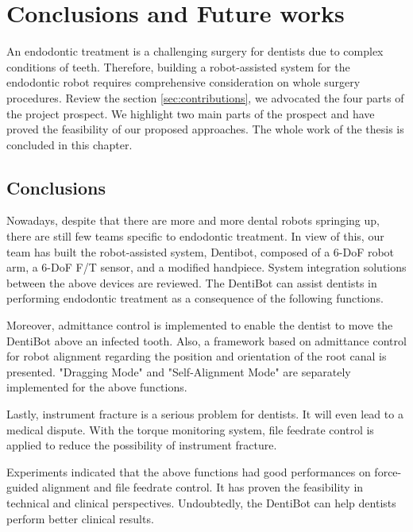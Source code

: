 \chapter{Conclusions and Future works}
\label{chapter7}
\hspace*{6mm}An endodontic treatment is a challenging surgery for dentists due to complex conditions of teeth. Therefore, building a robot-assisted system for the endodontic robot requires comprehensive consideration on whole surgery procedures. Review the section \ref{sec:contributions}, we advocated the four parts of the project prospect. We highlight two main parts of the prospect and have proved the feasibility of our proposed approaches. The whole work of the thesis is concluded in this chapter.
\section{Conclusions}
\hspace*{6mm}Nowadays, despite that there are more and more dental robots springing up, there are still few teams specific to endodontic treatment. In view of this, our team has built the robot-assisted system, Dentibot, composed of a 6-DoF robot arm, a 6-DoF F/T sensor, and a modified handpiece. System integration solutions between the above devices are reviewed. The DentiBot can assist dentists in performing endodontic treatment as a consequence of the following functions. 
\par
Moreover, admittance control is implemented to enable the dentist to move the DentiBot above an infected tooth. Also, a framework based on admittance control for robot alignment regarding the position and orientation of the root canal is presented. "Dragging Mode" and "Self-Alignment Mode" are separately implemented for the above functions.
\par
Lastly, instrument fracture is a serious problem for dentists. It will even lead to a medical dispute. With the torque monitoring system, file feedrate control is applied to reduce the possibility of instrument fracture. 
\par
Experiments indicated that the above functions had good performances on force-guided alignment and file feedrate control. It has proven the feasibility in technical and clinical perspectives. Undoubtedly, the DentiBot can help dentists perform better clinical results.
